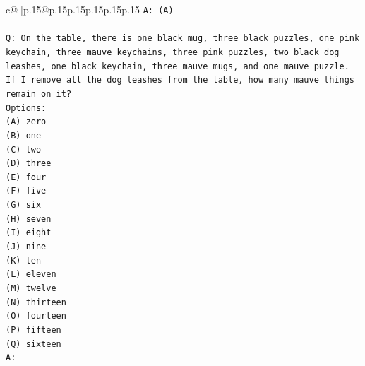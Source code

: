 \documentclass{article}
\begin{document}
{\begin{supertabular}{c@{$\;$}|p{.15\linewidth}@{}p{.15\linewidth}p{.15\linewidth}p{.15\linewidth}p{.15\linewidth}p{.15\linewidth}}
{{{\texttt{A: (A)} \\
\\ 
\texttt{Q: On the table, there is one black mug, three black puzzles, one pink keychain, three mauve keychains, three pink puzzles, two black dog leashes, one black keychain, three mauve mugs, and one mauve puzzle. If I remove all the dog leashes from the table, how many mauve things remain on it?} \\
\texttt{Options:} \\
\texttt{(A) zero} \\
\texttt{(B) one} \\
\texttt{(C) two} \\
\texttt{(D) three} \\
\texttt{(E) four} \\
\texttt{(F) five} \\
\texttt{(G) six} \\
\texttt{(H) seven} \\
\texttt{(I) eight} \\
\texttt{(J) nine} \\
\texttt{(K) ten} \\
\texttt{(L) eleven} \\
\texttt{(M) twelve} \\
\texttt{(N) thirteen} \\
\texttt{(O) fourteen} \\
\texttt{(P) fifteen} \\
\texttt{(Q) sixteen} \\
\texttt{A:} \\
            }
        }
    }
     \\ \\


\end{supertabular}}
\end{document}
